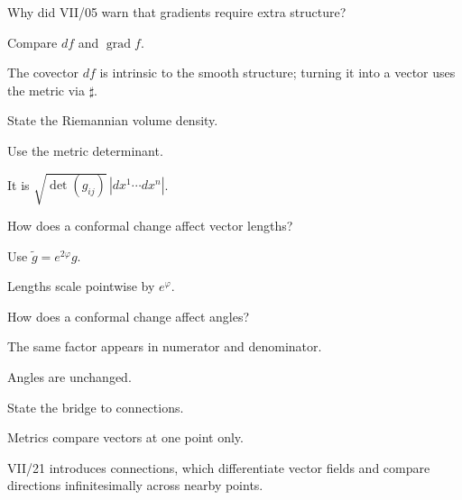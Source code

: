 \begin{exercise}\label{exr:vii20-20}
Why did VII/05 warn that gradients require extra structure?
\end{exercise}
\begin{hint}
Compare \(df\) and \(\operatorname{grad}f\).
\end{hint}
\begin{solution}
The covector \(df\) is intrinsic to the smooth structure; turning it into a vector uses the metric via \(\sharp\).
\end{solution}

\begin{exercise}\label{exr:vii20-21}
State the Riemannian volume density.
\end{exercise}
\begin{hint}
Use the metric determinant.
\end{hint}
\begin{solution}
It is \(\sqrt{\det(g_{ij})}\,|dx^1\cdots dx^n|\).
\end{solution}

\begin{exercise}\label{exr:vii20-22}
How does a conformal change affect vector lengths?
\end{exercise}
\begin{hint}
Use \(\widetilde g=e^{2\varphi}g\).
\end{hint}
\begin{solution}
Lengths scale pointwise by \(e^\varphi\).
\end{solution}

\begin{exercise}\label{exr:vii20-23}
How does a conformal change affect angles?
\end{exercise}
\begin{hint}
The same factor appears in numerator and denominator.
\end{hint}
\begin{solution}
Angles are unchanged.
\end{solution}

\begin{exercise}\label{exr:vii20-24}
State the bridge to connections.
\end{exercise}
\begin{hint}
Metrics compare vectors at one point only.
\end{hint}
\begin{solution}
VII/21 introduces connections, which differentiate vector fields and compare directions infinitesimally across nearby points.
\end{solution}

